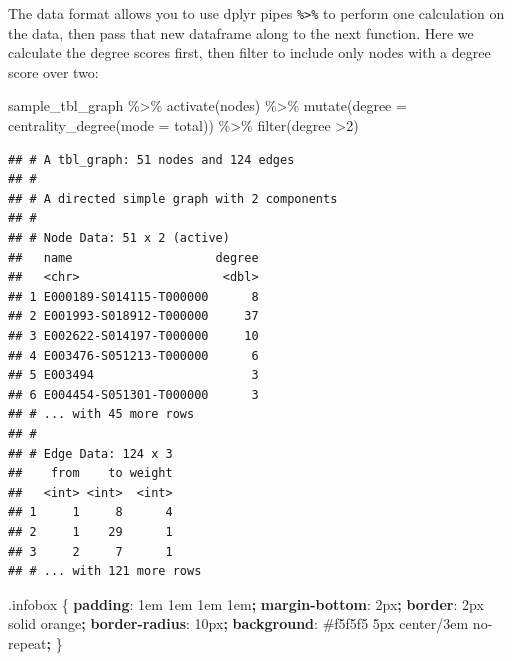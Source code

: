 \documentclass[
]{book}
\newenvironment{Shaded}{\begin{snugshade}}{\end{snugshade}}
\newcommand{\AttributeTok}[1]{\textcolor[rgb]{0.77,0.63,0.00}{#1}}
\newcommand{\ConstantTok}[1]{\textcolor[rgb]{0.00,0.00,0.00}{#1}}
\newcommand{\DataTypeTok}[1]{\textcolor[rgb]{0.13,0.29,0.53}{#1}}
\newcommand{\DecValTok}[1]{\textcolor[rgb]{0.00,0.00,0.81}{#1}}
\newcommand{\FunctionTok}[1]{\textcolor[rgb]{0.00,0.00,0.00}{#1}}
\newcommand{\KeywordTok}[1]{\textcolor[rgb]{0.13,0.29,0.53}{\textbf{#1}}}
\newcommand{\NormalTok}[1]{#1}
\newcommand{\OperatorTok}[1]{\textcolor[rgb]{0.81,0.36,0.00}{\textbf{#1}}}
\newcommand{\SpecialCharTok}[1]{\textcolor[rgb]{0.00,0.00,0.00}{#1}}
\newcommand{\StringTok}[1]{\textcolor[rgb]{0.31,0.60,0.02}{#1}}
\begin{document}
The data format allows you to use dplyr pipes \texttt{\%\textgreater{}\%} to perform one calculation on the data, then pass that new dataframe along to the next function. Here we calculate the degree scores first, then filter to include only nodes with a degree score over two:

\begin{Shaded}
\begin{Highlighting}[]
\NormalTok{sample\_tbl\_graph }\SpecialCharTok{\%\textgreater{}\%} 
  \FunctionTok{activate}\NormalTok{(nodes) }\SpecialCharTok{\%\textgreater{}\%} 
  \FunctionTok{mutate}\NormalTok{(}\AttributeTok{degree =} \FunctionTok{centrality\_degree}\NormalTok{(}\AttributeTok{mode =} \StringTok{\textquotesingle{}total\textquotesingle{}}\NormalTok{)) }\SpecialCharTok{\%\textgreater{}\%} 
  \FunctionTok{filter}\NormalTok{(degree }\SpecialCharTok{\textgreater{}}\DecValTok{2}\NormalTok{)}
\end{Highlighting}
\end{Shaded}

\begin{verbatim}
## # A tbl_graph: 51 nodes and 124 edges
## #
## # A directed simple graph with 2 components
## #
## # Node Data: 51 x 2 (active)
##   name                    degree
##   <chr>                    <dbl>
## 1 E000189-S014115-T000000      8
## 2 E001993-S018912-T000000     37
## 3 E002622-S014197-T000000     10
## 4 E003476-S051213-T000000      6
## 5 E003494                      3
## 6 E004454-S051301-T000000      3
## # ... with 45 more rows
## #
## # Edge Data: 124 x 3
##    from    to weight
##   <int> <int>  <int>
## 1     1     8      4
## 2     1    29      1
## 3     2     7      1
## # ... with 121 more rows
\end{verbatim}

\begin{Shaded}
\begin{Highlighting}[]
\FunctionTok{.infobox}\NormalTok{ \{}
  \KeywordTok{padding}\NormalTok{: }\DecValTok{1}\DataTypeTok{em} \DecValTok{1}\DataTypeTok{em} \DecValTok{1}\DataTypeTok{em} \DecValTok{1}\DataTypeTok{em}\OperatorTok{;}
  \KeywordTok{margin{-}bottom}\NormalTok{: }\DecValTok{2}\DataTypeTok{px}\OperatorTok{;}
  \KeywordTok{border}\NormalTok{: }\DecValTok{2}\DataTypeTok{px} \DecValTok{solid} \ConstantTok{orange}\OperatorTok{;}
  \KeywordTok{border{-}radius}\NormalTok{: }\DecValTok{10}\DataTypeTok{px}\OperatorTok{;}
  \KeywordTok{background}\NormalTok{: }\ConstantTok{\#f5f5f5} \DecValTok{5}\DataTypeTok{px} \DecValTok{center}\NormalTok{/}\DecValTok{3}\DataTypeTok{em} \DecValTok{no{-}repeat}\OperatorTok{;}
\NormalTok{\}}
\end{Highlighting}
\end{Shaded}
\end{document}
